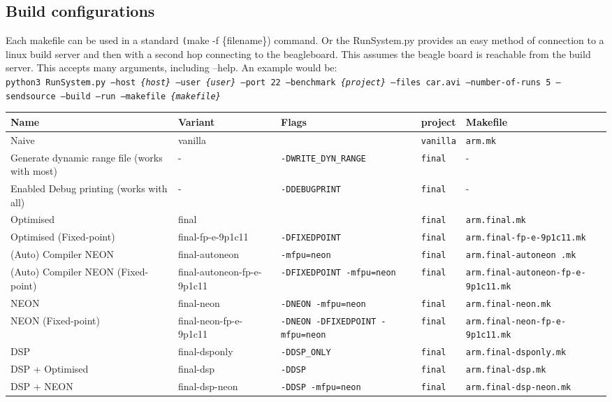 \documentclass[final]{article} %
\begin{document}
\begin{appendices}
\section{Build configurations}
Each makefile can be used in a standard \texttt(make -f \{filename\}) command.
Or the RunSystem.py provides an easy method of connection to a linux build server and then with a second hop connecting to the beagleboard. 
This assumes the beagle board is reachable from the build server.
This accepts many arguments, including --help.
An example would be:\\
\texttt{python3 RunSystem.py --host \emph{\{host\}} --user \emph{\{user\}} --port 22 --benchmark \emph{\{project\}} --files car.avi --number-of-runs 5 --sendsource --build --run --makefile \emph{\{makefile\}}}
\begin{table}[H]
	\centering
	\begin{tabular}{>{\raggedright}p{2.5cm}>{\raggedright}p{2.5cm}>{\raggedright}p{3cm}lp{5cm}}
	\toprule
	\textbf{Name}								& \textbf{Variant}			 & \textbf{Flags}							& \textbf{project}			& \textbf{Makefile}	\\
	\midrule
	Naive										& vanilla 					 & \texttt{}								& \texttt{vanilla}			& \texttt{arm.mk}	\\
	Generate dynamic range file	(works with most)& - 						 & \texttt{-DWRITE\_DYN\_RANGE}				& \texttt{final}	& -	\\
	Enabled Debug printing	(works with all)    & - 						 & \texttt{-DDEBUGPRINT}					& \texttt{final}	& -	\\
	Optimised									& final 					 & \texttt{}								& \texttt{final}	& \texttt{arm.final.mk}	\\
	Optimised (Fixed-point)						& final-fp-e-9p1c11			 & \texttt{-DFIXEDPOINT}	    			& \texttt{final}	& \texttt{arm.final-fp-e-9p1c11.mk}	\\
	(Auto) Compiler NEON						& final-autoneon 			 & \texttt{-mfpu=neon}		    			& \texttt{final}	& \texttt{arm.final-autoneon .mk}	\\
	(Auto) Compiler NEON (Fixed-point)			& final-autoneon-fp-e-9p1c11 & \texttt{-DFIXEDPOINT -mfpu=neon}		    & \texttt{final}	& \texttt{arm.final-autoneon-fp-e-9p1c11.mk}	\\
	NEON										& final-neon 				 & \texttt{-DNEON -mfpu=neon}		    	& \texttt{final}	& \texttt{arm.final-neon.mk}	\\
	NEON (Fixed-point)							& final-neon-fp-e-9p1c11	 & \texttt{-DNEON -DFIXEDPOINT -mfpu=neon}	& \texttt{final}	& \texttt{arm.final-neon-fp-e-9p1c11.mk}	\\
	DSP											& final-dsponly				 & \texttt{-DDSP\_ONLY}						& \texttt{final}	& \texttt{arm.final-dsponly.mk}	\\
	DSP + Optimised								& final-dsp 				 & \texttt{-DDSP}							& \texttt{final}	& \texttt{arm.final-dsp.mk}	\\
	DSP + NEON									& final-dsp-neon 			 & \texttt{-DDSP -mfpu=neon}				& \texttt{final}	& \texttt{arm.final-dsp-neon.mk}	\\
	\bottomrule
	\end{tabular}
\end{table}


\end{appendices}
\end{document}
